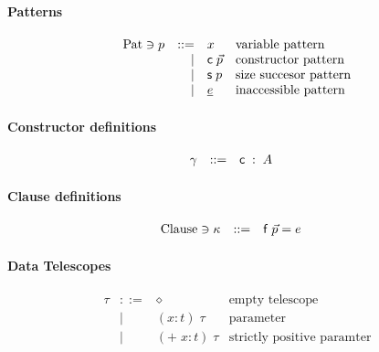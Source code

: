 \paragraph*{Patterns}
\[
\begin{array}{lrll}
\mathrm{Pat} \ni p & ::= & x & \mbox{variable pattern}\\
& \mid & \mathsf{c} \; \vec{p} & \mbox{constructor pattern}\\
& \mid & \mathsf{s}\; p & \mbox{size succesor pattern}\\
& \mid & \underline{e} & \mbox{inaccessible pattern}\\
\end{array}
\]

\paragraph*{Constructor definitions}
\[
\begin{array}{lrll}
\gamma &  ::= & \mathsf{c} \; : \; A & 
\end{array}
\]

\paragraph*{Clause definitions}
\[
\begin{array}{lrll}
\mathrm{Clause} \ni \kappa & ::= & \mathsf{f} \; \vec{p} = e & 
\end{array}
\]

\paragraph*{Data Telescopes}
\[
\begin{array}{lrll}
\tau & ::= & \diamond & \mbox{empty telescope}\\
& \mid & ( x : t ) \; \tau & \mbox{parameter}\\
& \mid & ( + \; x : t ) \; \tau & \mbox{strictly positive paramter}
\end{array}
\]

